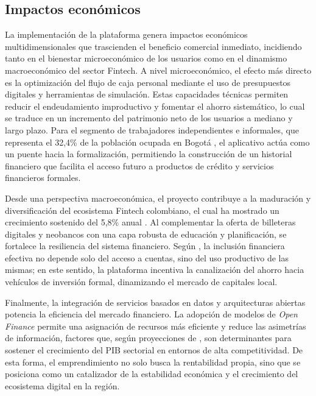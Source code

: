 \subsection*{Impactos económicos}

La implementación de la plataforma genera impactos económicos multidimensionales que trascienden el beneficio comercial inmediato, incidiendo tanto en el bienestar microeconómico de los usuarios como en el dinamismo macroeconómico del sector Fintech. A nivel microeconómico, el efecto más directo es la optimización del flujo de caja personal mediante el uso de presupuestos digitales y herramientas de simulación. Estas capacidades técnicas permiten reducir el endeudamiento improductivo y fomentar el ahorro sistemático, lo cual se traduce en un incremento del patrimonio neto de los usuarios a mediano y largo plazo. Para el segmento de trabajadores independientes e informales, que representa el 32,4\% de la población ocupada en Bogotá \parencite{DANE01}, el aplicativo actúa como un puente hacia la formalización, permitiendo la construcción de un historial financiero que facilita el acceso futuro a productos de crédito y servicios financieros formales.

Desde una perspectiva macroeconómica, el proyecto contribuye a la maduración y diversificación del ecosistema Fintech colombiano, el cual ha mostrado un crecimiento sostenido del 5,8\% anual \parencite{RevistaCIES01}. Al complementar la oferta de billeteras digitales y neobancos con una capa robusta de educación y planificación, se fortalece la resiliencia del sistema financiero. Según \textcite{BancadeOportunidades01}, la inclusión financiera efectiva no depende solo del acceso a cuentas, sino del uso productivo de las mismas; en este sentido, la plataforma incentiva la canalización del ahorro hacia vehículos de inversión formal, dinamizando el mercado de capitales local.

Finalmente, la integración de servicios basados en datos y arquitecturas abiertas potencia la eficiencia del mercado financiero. La adopción de modelos de \textit{Open Finance} permite una asignación de recursos más eficiente y reduce las asimetrías de información, factores que, según proyecciones de \textcite{Asobancaria01}, son determinantes para sostener el crecimiento del PIB sectorial en entornos de alta competitividad. De esta forma, el emprendimiento no solo busca la rentabilidad propia, sino que se posiciona como un catalizador de la estabilidad económica y el crecimiento del ecosistema digital en la región.